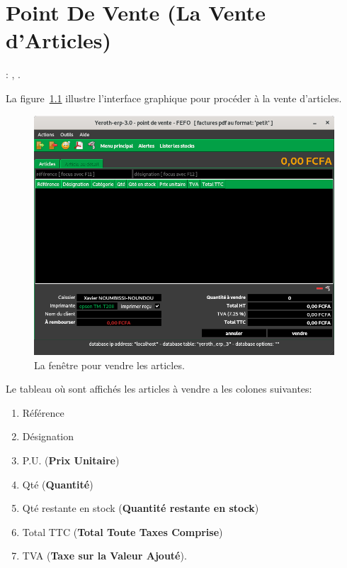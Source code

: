 \chapter{Point De Vente (La Vente d'Articles)}\label{chap:vendre}

\utilisateurs: \liencaissier, \lienmanager.\\


\label{sec:vendre-introduction}

La figure~\ref{fig:fenetre-vendre} illustre
l'interface graphique pour proc\'eder \`a la
vente d'articles.

\begin{figure}[!htbp]
	\centering
	\includegraphics[scale=0.63]{images/yeren-fenetre-caissier.png}
	\caption{La fen\^etre pour vendre les articles.}
	\label{fig:fenetre-vendre}
\end{figure}

Le tableau o\`u sont affich\'es les articles \`a vendre
a les colones suivantes:
\begin{enumerate}[1)]
	\item R\'ef\'erence
	\item D\'esignation
	\item P.U. (\textbf{Prix Unitaire})
	\item Qt\'e (\textbf{Quantit\'e})
	\item Qt\'e restante en stock (\textbf{Quantit\'e restante en stock})
	\item Total TTC (\textbf{Total Toute Taxes Comprise})	
	\item TVA (\textbf{Taxe sur la Valeur Ajout\'e}).
\end{enumerate}

